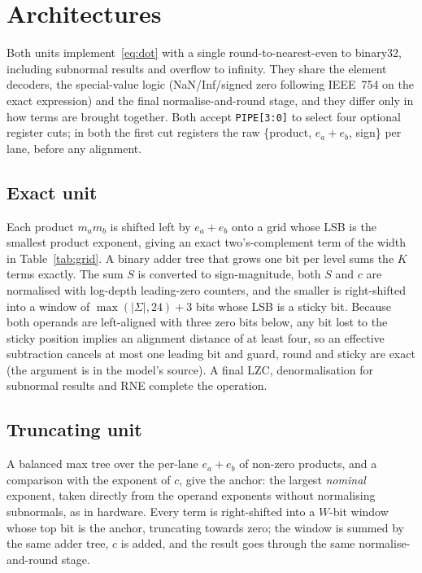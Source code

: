 \documentclass[conference,compsoc]{IEEEtran}
\begin{document}
\section{Architectures}\label{sec:arch}
Both units implement~\eqref{eq:dot} with a single round-to-nearest-even to
binary32, including subnormal results and overflow to infinity.  They share
the element decoders, the special-value logic (NaN/Inf/signed zero following
IEEE~754 on the exact expression) and the final normalise-and-round stage,
and they differ only in how terms are brought together.  Both accept
\texttt{PIPE[3:0]} to select four optional register cuts; in both the first
cut registers the raw \{product, $e_a+e_b$, sign\} per lane, before any
alignment.

\subsection{Exact unit}
Each product $m_a m_b$ is shifted left by $e_a+e_b$ onto a grid whose LSB is
the smallest product exponent, giving an exact two's-complement term of the
width in Table~\ref{tab:grid}.  A binary adder tree that grows one bit per
level sums the $K$ terms exactly.  The sum $S$ is converted to sign-magnitude,
both $S$ and $c$ are normalised with log-depth leading-zero counters, and the
smaller is right-shifted into a window of $\max(|\Sigma|,24)+3$ bits whose
LSB is a sticky bit.  Because both operands are left-aligned with three zero
bits below, any bit lost to the sticky position implies an alignment
distance of at least four, so an effective subtraction cancels at most one
leading bit and guard, round and sticky are exact (the argument is in the
model's source).  A final LZC, denormalisation for subnormal results and RNE
complete the operation.

\subsection{Truncating unit}
A balanced max tree over the per-lane $e_a+e_b$ of non-zero products, and a
comparison with the exponent of $c$, give the anchor: the largest
\emph{nominal} exponent, taken directly from the operand exponents without
normalising subnormals, as in hardware.  Every term is right-shifted into a
$W$-bit window whose top bit is the anchor, truncating towards zero; the
window is summed by the same adder tree, $c$ is added, and the result goes
through the same normalise-and-round stage.
\end{document}
